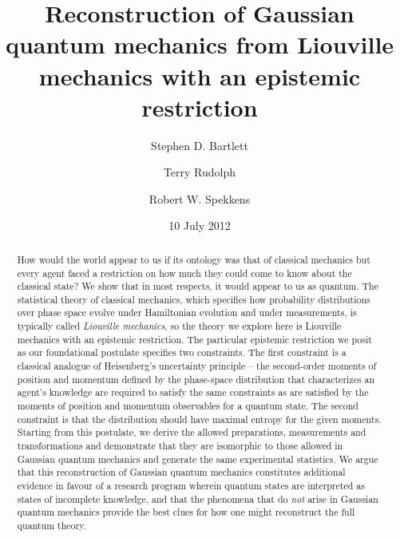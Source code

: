 \documentclass[pra,superscriptaddress,nofootinbib,12pt]{revtex4-2}
\begin{document}
\title{Reconstruction of Gaussian quantum mechanics from Liouville mechanics with an epistemic restriction}
\author{Stephen D. Bartlett}
\author{Terry Rudolph}
\author{Robert W. Spekkens}
\date{10 July 2012}

\begin{abstract}
How would the world appear to us if its ontology was that of classical mechanics but every agent faced a restriction on how much they could come to know about the classical state?  We show that in most respects, it would appear to us as quantum. The statistical theory of classical mechanics, which specifies how probability distributions over phase space evolve under Hamiltonian evolution and under measurements, is typically called \emph{Liouville mechanics}, so the theory we explore here is Liouville mechanics with an epistemic restriction.
The particular epistemic restriction we posit as our foundational postulate specifies two constraints.   The first constraint is a classical analogue of Heisenberg's uncertainty principle -- the second-order moments of position and momentum defined by the phase-space distribution that characterizes an agent's knowledge are required to satisfy the same constraints as are satisfied by the moments of position and momentum observables for a quantum state.  The second constraint is that the distribution should have maximal entropy for the given moments.
Starting from this postulate, we derive the allowed preparations, measurements and transformations
and demonstrate that they are isomorphic to those allowed in Gaussian quantum mechanics and generate the same experimental statistics.
We argue that this reconstruction of Gaussian quantum mechanics constitutes additional evidence in favour of a research program wherein quantum states are interpreted as states of incomplete knowledge,
and that the phenomena that do \emph{not} arise in Gaussian quantum mechanics provide the best clues for how one might reconstruct the full quantum theory.



\end{abstract}
\end{document}
